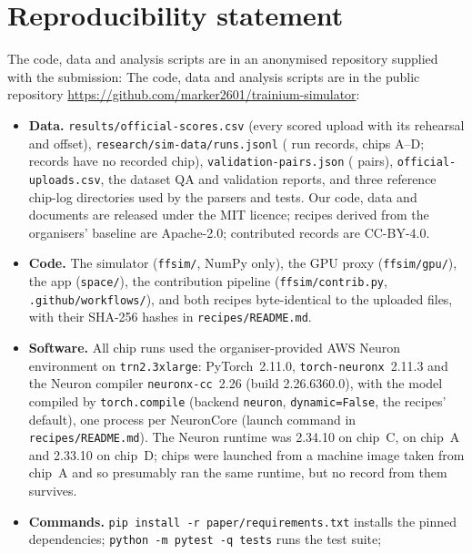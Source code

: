 \section*{Reproducibility statement}

\ifanonymous
The code, data and analysis scripts are in an anonymised repository supplied with the submission:
\else
The code, data and analysis scripts are in the public repository
\url{https://github.com/marker2601/trainium-simulator}:
\fi
\begin{itemize}
  \item \textbf{Data.} \texttt{results/official-scores.csv} (every scored upload with its rehearsal and offset),
    \texttt{research/sim-data/runs.jsonl} ( run records, chips A--D;  records have no
    recorded chip), \texttt{validation-pairs.json} ( pairs), \texttt{official-uploads.csv}, the
    dataset QA and validation reports, and three reference chip-log directories used by the parsers and tests. Our
    code, data and documents are released under the MIT licence; recipes derived from the organisers' baseline are
    Apache-2.0; contributed records are CC-BY-4.0.
  \item \textbf{Code.} The simulator (\texttt{ffsim/}, NumPy only), the GPU proxy (\texttt{ffsim/gpu/}), the app
    (\texttt{space/}), the contribution pipeline (\texttt{ffsim/contrib.py}, \texttt{.github/workflows/}), and both
    recipes byte-identical to the uploaded files, with their SHA-256 hashes in \texttt{recipes/README.md}.
  \item \textbf{Software.} All chip runs used the organiser-provided AWS Neuron environment on \texttt{trn2.3xlarge}:
    PyTorch~2.11.0, \texttt{torch-neuronx}~2.11.3 and the Neuron compiler \texttt{neuronx-cc}~2.26 (build
    2.26.6360.0), with the model compiled by \texttt{torch.compile} (backend \texttt{neuron},
    \texttt{dynamic=False}, the recipes' default), one process per NeuronCore (launch command in
    \texttt{recipes/README.md}). The Neuron runtime was 2.34.10 on chip~C, \docnum{} on chip~A
    and 2.33.10 on chip~D; chips \docnum{} were launched from a machine image taken from chip~A and
    so presumably ran the same runtime, but no record from them survives.
  \item \textbf{Commands.} \texttt{pip install -r paper/requirements.txt} installs the pinned dependencies; \texttt{python -m pytest -q tests} runs the test suite;

\end{itemize}
